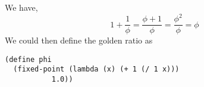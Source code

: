 \documentclass[a4paper,12pt]{article}
\begin{document}
We have,
\[1 + \frac{1}{\phi} = \frac{\phi + 1}{\phi} =
 \frac{\phi^2}{\phi} =
 \phi\]
We could then define the golden ratio as
\begin{lstlisting}
(define phi
  (fixed-point (lambda (x) (+ 1 (/ 1 x)))
	       1.0))
\end{lstlisting}
\end{document}
